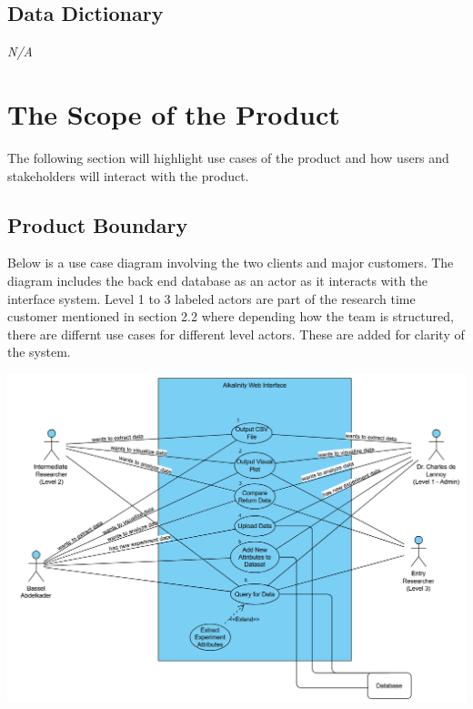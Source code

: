 \documentclass[12pt]{article}
\begin{document}
\subsection{Data Dictionary}
\emph{N/A}

\section{The Scope of the Product}
The following section will highlight use cases of the product and how users and
stakeholders will interact with the product.  
\subsection{Product Boundary}
Below is a use case diagram involving the two clients and major customers. The
diagram includes the back end database as an actor as it interacts with the
interface system. Level 1 to 3 labeled actors are part of the research time
customer mentioned in section 2.2 where depending how the team is structured,
there are differnt use cases for different level actors. These are added for
clarity of the system.
\begin{center}
  \includegraphics[scale=0.5]{capstoneUseCase.png}
\end{center}
\end{document}
